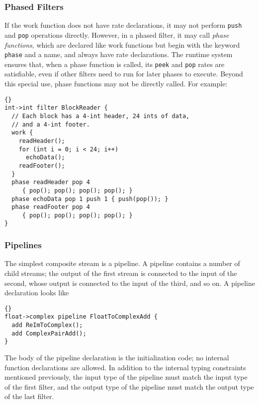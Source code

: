 \documentclass[11pt]{article}
\begin{document}
\subsubsection{Phased Filters}  
\label{sec:phased-filter}

If the work function does not have rate declarations, it may not
perform \lstinline|push| and \lstinline|pop| operations directly.
However, in a phased filter, it may call \emph{phase functions}, which
are declared like work functions but begin with the keyword
\lstinline|phase| and a name, and always have rate declarations.  The
runtime system ensures that, when a phase function is called, its
\lstinline|peek| and \lstinline|pop| rates are satisfiable, even if
other filters need to run for later phases to execute.  Beyond this
special use, phase functions may not be directly called.  For example:

\begin{lstlisting}{}
int->int filter BlockReader {
  // Each block has a 4-int header, 24 ints of data,
  // and a 4-int footer.
  work {
    readHeader();
    for (int i = 0; i < 24; i++)
      echoData();
    readFooter();
  }
  phase readHeader pop 4
     { pop(); pop(); pop(); pop(); }
  phase echoData pop 1 push 1 { push(pop()); }
  phase readFooter pop 4
     { pop(); pop(); pop(); pop(); }
}
\end{lstlisting}

\subsubsection{Pipelines}

The simplest composite stream is a pipeline.  A pipeline contains a
number of child streams; the output of the first stream is connected
to the input of the second, whose output is connected to the input of
the third, and so on.  A pipeline declaration looks like

\begin{lstlisting}{}
float->complex pipeline FloatToComplexAdd {
  add ReImToComplex();
  add ComplexPairAdd();
}
\end{lstlisting}

The body of the pipeline declaration is the initialization code; no
internal function declarations 
are allowed.  In addition to the internal typing constraints mentioned
previously, the input type of the pipeline must match the input type
of the first filter, and the output type of the pipeline must match
the output type of the last filter.
\end{document}
